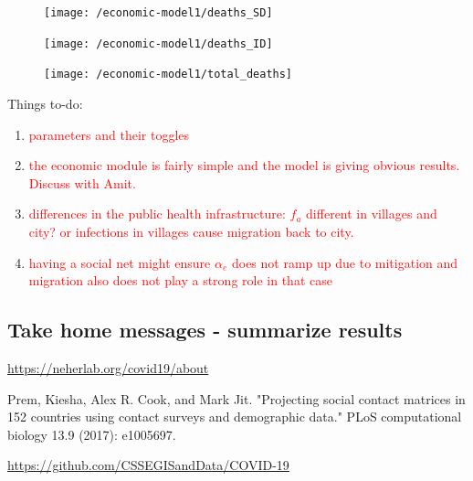 \documentclass{article}
\begin{document}
\begin{figure}[H]
	\centering
	\texttt{[image: /economic-model1/deaths\_SD]}
\end{figure}


\begin{figure}[H]
	\centering
	\texttt{[image: /economic-model1/deaths\_ID]}
\end{figure}


\begin{figure}[H]
	\centering
	\texttt{[image: /economic-model1/total\_deaths]}
\end{figure}

\pagebreak
Things to-do:

\begin{enumerate}
	\item \textcolor{red}{parameters and their toggles}
	
	\item \textcolor{red}{the economic module is fairly simple and the model is giving obvious results. Discuss with Amit.}
	
	\item \textcolor{red}{differences in the public health infrastructure: $f_a$ different in villages and city? or infections in villages cause migration back to city. }
	
	\item \textcolor{red}{having a social net might ensure $\alpha_e$ does not ramp up due to mitigation and migration also does not play a strong role in that case}
	
\end{enumerate}



\subsection{Take home messages - summarize results}

\begin{thebibliography}{10} 
	
	 \url{https://neherlab.org/covid19/about}

	 Prem, Kiesha, Alex R. Cook, and Mark Jit. "Projecting social contact matrices in 152 countries using contact surveys and demographic data." PLoS computational biology 13.9 (2017): e1005697.
	
	 \url{https://github.com/CSSEGISandData/COVID-19}
	
\end{thebibliography}
\end{document}
